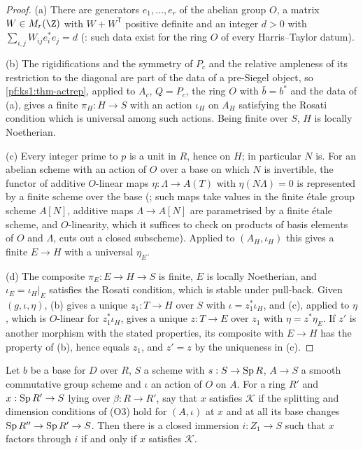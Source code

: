 \begin{proof}
(a) There are generators $e_1,\dots,e_r$ of the abelian group $O$, a matrix $W\in M_r(\Z)$ with $W+W^{\mathsf T}$ positive definite and an
integer $d>0$ with $\sum_{i,j}W_{ij}e_i^*e_j=d$ (: such data exist for
the ring $O$ of every Harris--Taylor datum).

(b) The rigidifications and the symmetry of $P_c$ and the relative ampleness of its restriction to the diagonal are part of the data of a
pre-Siegel object, so \cref{pf:ks1:thm-actrep}, applied to $A_c$, $Q=P_c$, the ring $O$ with $\bar b=b^*$ and the data of (a), gives a finite
$\pi_H:H\to S$ with an action $\iota_H$ on $A_H$ satisfying the Rosati condition which is universal among such actions. Being finite over $S$,
$H$ is locally Noetherian.

(c) Every integer prime to $p$ is a unit in $R$, hence on $H$; in particular $N$ is. For an abelian scheme with an action of $O$ over a base on
which $N$ is invertible, the functor of additive $O$-linear maps $\eta:\Lambda\to A(T)$ with $\eta(N\Lambda)=0$ is represented by a finite scheme
over the base (; such maps take values in the finite \'etale group
scheme $A[N]$, additive maps $\Lambda\to A[N]$ are parametrised by a finite \'etale scheme, and $O$-linearity, which it suffices to check on
products of basis elements of $O$ and $\Lambda$, cuts out a closed subscheme). Applied to $(A_H,\iota_H)$ this gives a finite $E\to H$ with a
universal $\eta_E$.

(d) The composite $\pi_E:E\to H\to S$ is finite, $E$ is locally Noetherian, and $\iota_E=\iota_H|_E$ satisfies the Rosati condition, which is
stable under pull-back. Given $(g,\iota,\eta)$, (b) gives a unique $z_1:T\to H$ over $S$ with $\iota=z_1^*\iota_H$, and (c), applied to $\eta$,
which is $O$-linear for $z_1^*\iota_H$, gives a unique $z:T\to E$ over $z_1$ with $\eta=z^*\eta_E$. If $z'$ is another morphism with the stated
properties, its composite with $E\to H$ has the property of (b), hence equals $z_1$, and $z'=z$ by the uniqueness in (c).
\end{proof}

\begin{lemma}\label{pf:ks1:lem-lieher}
Let $b$ be a base for $D$ over $R$, $S$ a scheme with $s:S\to\operatorname{Sp} R$, $A\to S$ a smooth commutative group scheme and $\iota$ an action of
$O$ on $A$. For a ring $R'$ and $x:\operatorname{Sp} R'\to S$ lying over $\beta:R\to R'$, say that $x$ satisfies $\mathcal K$ if the splitting and
dimension conditions of (O3) hold for $(A,\iota)$ at $x$ and at all its base changes $\operatorname{Sp} R''\to\operatorname{Sp} R'\to S$. Then there is a closed
immersion $i:Z_1\to S$ such that $x$ factors through $i$ if and only if $x$ satisfies $\mathcal K$.
\end{lemma}

